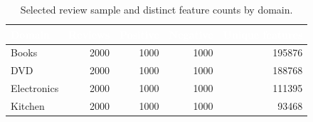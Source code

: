 \begin{table}[H]
\centering\small
\caption{Selected review sample and distinct feature counts by domain.}
\label{tab:dataset}
\setlength{\tabcolsep}{7pt}
\renewcommand{\arraystretch}{1.18}
\begin{tabular}{|l|r|r|r|r|}
\hline
\rowcolor{Navy}\textcolor{white}{\textbf{Domain}} & \textcolor{white}{\textbf{Reviews}} & \textcolor{white}{\textbf{Positive}} & \textcolor{white}{\textbf{Negative}} & \textcolor{white}{\textbf{Unique features}} \\
\hline
Books & 2000 & 1000 & 1000 & 195876 \\
\hline
DVD & 2000 & 1000 & 1000 & 188768 \\
\hline
Electronics & 2000 & 1000 & 1000 & 111395 \\
\hline
Kitchen & 2000 & 1000 & 1000 & 93468 \\
\hline
\end{tabular}
\end{table}